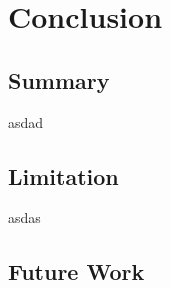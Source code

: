 \chapter{Conclusion}
\label{ch: chapter 5}
\section{Summary}
asdad
\section{Limitation}
asdas
\section{Future Work}

